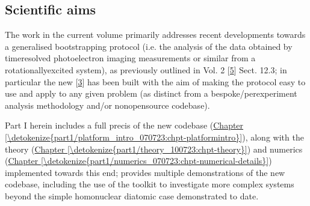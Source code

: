 \documentclass[letterpaper,table,10pt,english]{jupyterBook}
\begin{document}
\subsection{Scientific aims}
\label{\detokenize{part1/main_intro_060723:scientific-aims}}
\sphinxAtStartPar
The work in the current volume primarily addresses recent developments towards a generalised bootstrapping protocol (i.e. the analysis of the data obtained by time\sphinxhyphen{}resolved photoelectron imaging measurements \sphinxhyphen{} or similar \sphinxhyphen{} from a rotationally\sphinxhyphen{}excited system), as previously outlined in  Vol. 2 {[}\hyperlink{cite.backmatter/bibliography:id664}{5}{]} Sect. 12.3; in particular the new  {[}\hyperlink{cite.backmatter/bibliography:id668}{3}{]} has been built with the aim of making the protocol easy to use and apply to any given problem (as distinct from a bespoke/per\sphinxhyphen{}experiment analysis methodology and/or non\sphinxhyphen{}open\sphinxhyphen{}source codebase).

\sphinxAtStartPar
Part I herein includes a full precis of the new codebase (\hyperref[\detokenize{part1/platform_intro_070723:chpt-platformintro}]{Chapter \ref{\detokenize{part1/platform_intro_070723:chpt-platformintro}}}), along with the theory (\hyperref[\detokenize{part1/theory_100723:chpt-theory}]{Chapter \ref{\detokenize{part1/theory_100723:chpt-theory}}}) and numerics (\hyperref[\detokenize{part1/numerics_070723:chpt-numerical-details}]{Chapter \ref{\detokenize{part1/numerics_070723:chpt-numerical-details}}}) implemented towards this end; {\hyperref[\detokenize{part2/extracting_matrix_elements_overview_270423:chpt-extracting-matrix-elements-overview}]{}} provides multiple demonstrations of the new code\sphinxhyphen{}base, including the use of the toolkit to investigate more complex systems beyond the simple homonuclear diatomic case demonstrated to date.
\end{document}
